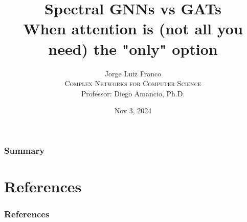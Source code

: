 \documentclass[aspectratio=169,dvipsnames]{beamer}
\title[Spectral GNNs vs GAT
]{Spectral GNNs vs GATs \\ When attention is (not all you need) the "only" option
}
\author[Jorge Luiz Franco]{Jorge Luiz Franco\\ \bigskip
\textsc{Complex Networks for Computer Science}\\ \bigskip
Professor: Diego Amancio, Ph.D.}
\institute[ICMC/USP]{Universidade de São Paulo - ICMC}
\date[2024]{\footnotesize{Nov 3, 2024}}
\begin{document}
    \begin{frame}[plain]
        \titlepage
    \end{frame}

    \begin{frame}
      \frametitle{Summary}
      \tableofcontents
    \end{frame}









% 


% 




\section{References}

\begin{frame}[allowframebreaks]
  \frametitle{References}
  

  
\end{frame}
\end{document}

